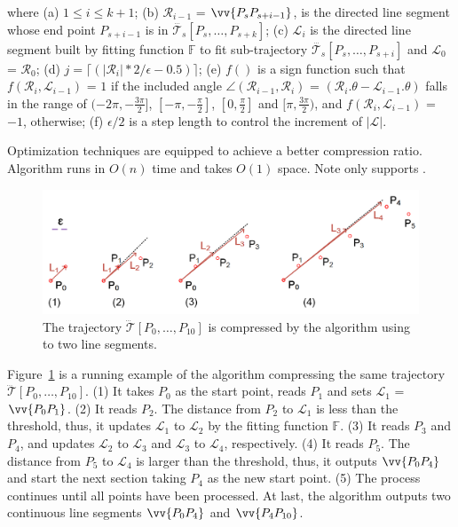\ni where (a) $1 \le i \le k+1$; (b) $\mathcal{R}_{i-1}$ = $\vv{P_sP_{s+i-1}}$, is the directed line segment whose end point $P_{s+i-1}$ is in $\dddot{\mathcal{T}_s}[P_s, \ldots, P_{s+k}]$; (c) $\mathcal{L}_{i}$ is the directed line segment built by fitting function $\mathbb{F}$ to fit sub-trajectory $\dddot{\mathcal{T}_s}[P_s, \ldots, P_{s+i}]$ and $\mathcal{L}_{0}$ = $\mathcal{R}_{0}$; (d) $j = \lceil(|\mathcal{R}_{i}|*2/\epsilon - 0.5)\rceil$; (e) $f()$ is a sign function such that $ f(\mathcal{R}_i,\mathcal{L}_{i-1})$ = $1$ if the included angle $\angle(\mathcal{R}_{i-1}, \mathcal{R}_{i})$ = $(\mathcal{R}_i.\theta - \mathcal{L}_{i-1}.\theta)$ falls in the range of $(-2\pi, -\frac{3\pi}{2}]$, $[-\pi, -\frac{\pi}{2}]$, $[0, \frac{\pi}{2}]$ and $[\pi, \frac{3\pi}{2})$, and $f(\mathcal{R}_i,\mathcal{L}_{i-1})$ = $-1$, otherwise; (f) $\epsilon/2$ is a step length to control the increment of $|\mathcal{L}|$.

Optimization techniques are equipped to achieve a better compression ratio\cite{Lin:Operb}.
Algorithm \operb runs in $O(n)$ time and takes $O(1)$ space.
Note \operb only supports \ped.


\begin{figure}[tb!]
	\centering
	\includegraphics[scale=0.66]{figures/Fig-oper.png}
	\vspace{-3ex}
	\caption{\small The trajectory $\dddot{\mathcal{T}}[P_0, \ldots, P_{10}]$ is compressed by the \operb algorithm using \ped to two line segments.}
	\vspace{-2ex}
	\label{fig:operb}
\end{figure}



\begin{example}
	\label{exm-alg-operb}
	Figure~\ref{fig:operb} is a running example of the \operb algorithm compressing the same trajectory $\dddot{\mathcal{T}}[P_0, \ldots, P_{10}]$.
	(1) It takes $P_0$ as the start point, reads $P_1$ and sets $\mathcal{L}_1$ = $\vv{P_0P_1}$.
	(2) It reads $P_2$. The distance from $P_2$ to $\mathcal{L}_1$ is less than the threshold, thus, it updates $\mathcal{L}_1$  to $\mathcal{L}_2$ by the fitting function $\mathbb{F}$.
	(3) It reads $P_3$ and $P_4$, and updates $\mathcal{L}_2$ to $\mathcal{L}_3$ and $\mathcal{L}_3$ to $\mathcal{L}_4$, respectively.
	(4) It reads $P_5$. The distance from $P_5$ to $\mathcal{L}_4$ is larger than the threshold, thus, it outputs $\vv{P_0P_4}$ and start the next section taking $P_4$ as the new start point.
	(5) The process continues until all points have been processed. At last, the algorithm outputs two continuous line segments $\vv{P_0P_4}$ and $\vv{P_4P_{10}}$.
\end{example}




